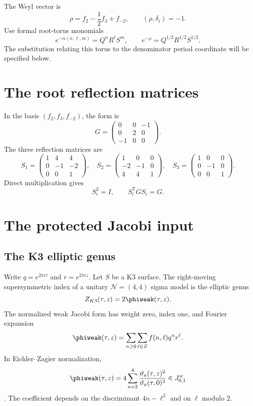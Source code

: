 The Weyl vector is
\[
 \rho=f_2-\frac12f_3+f_{-2},
 \qquad (\rho,\delta_i)=-1.
\]
Use formal root-torus monomials
\[
 e^{-\alpha(n,\ell,m)}=Q^nR^\ell S^m,\qquad
 e^{-\rho}=Q^{1/2}R^{1/2}S^{1/2}.
\]
The substitution relating this torus to the denominator period
coordinate will be specified below.


\section{The root reflection matrices}
In the basis $(f_2,f_3,f_{-2})$, the form is
\[
 G=\begin{pmatrix}0&0&-1\\0&2&0\\-1&0&0\end{pmatrix}.
\]
The three reflection matrices are
\[
 S_1=\begin{pmatrix}1&4&4\\0&-1&-2\\0&0&1\end{pmatrix},\quad
 S_2=\begin{pmatrix}1&0&0\\-2&-1&0\\4&4&1\end{pmatrix},\quad
 S_3=\begin{pmatrix}1&0&0\\0&-1&0\\0&0&1\end{pmatrix}.
\]
Direct multiplication gives
\[
 S_i^2=I,
 \qquad S_i^{\mathsf T}GS_i=G.
\]


\section{The protected Jacobi input}
\subsection{The K3 elliptic genus}
Write \(q=e^{2\pi i\tau}\) and \(r=e^{2\pi iz}\).
Let $S$ be a K3 surface. The right-moving supersymmetric index of a unitary $\mathcal N=(4,4)$ sigma model is the elliptic genus
\[
 Z_{K3}(\tau,z)=2\phiweak(\tau,z).
\]
The normalized weak Jacobi form has weight zero, index one, and Fourier expansion
\[
 \phiweak(\tau,z)=\sum_{n\ge0}\sum_{\ell\in\Z}f(n,\ell)q^nr^\ell.
\]
In Eichler--Zagier normalization,
\[
 \phiweak(\tau,z)=4\sum_{a=2}^{4}
 \frac{\vartheta_a(\tau,z)^2}{\vartheta_a(\tau,0)^2}
 \in J^{\mathrm w}_{0,1}
\]
\cite{EZ}. The coefficient depends on the discriminant $4n-\ell^2$ and on $\ell$ modulo $2$.

